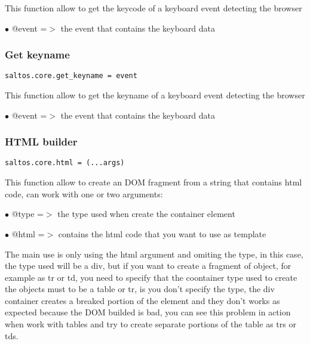 \documentclass[a4paper]{article}
\begin{document}
This function allow to get the keycode of a keyboard event detecting the browser

\begin{compactitem}
\item[\color{myblue}$\bullet$] @event =$>$ the event that contains the keyboard data
\end{compactitem}

\hypertarget{toc700}{}
\subsubsection{Get keyname}

\begin{lstlisting}
saltos.core.get_keyname = event
\end{lstlisting}

This function allow to get the keyname of a keyboard event detecting the browser

\begin{compactitem}
\item[\color{myblue}$\bullet$] @event =$>$ the event that contains the keyboard data
\end{compactitem}

\hypertarget{toc701}{}
\subsubsection{HTML builder}

\begin{lstlisting}
saltos.core.html = (...args)
\end{lstlisting}

This function allow to create an DOM fragment from a string that contains html code, can
work with one or two arguments:

\begin{compactitem}
\item[\color{myblue}$\bullet$] @type =$>$ the type used when create the container element
\item[\color{myblue}$\bullet$] @html =$>$ contains the html code that you want to use as template
\end{compactitem}

The main use is only using the html argument and omiting the type, in this case, the
type used will be a div, but if you want to create a fragment of object, for example
as tr or td, you need to specify that the coontainer type used to create the objects
must to be a table or tr, is you don't specify the type, the div container creates
a breaked portion of the element and they don't works as expected because the DOM
builded is bad, you can see this problem in action when work with tables and try to
create separate portions of the table as trs or tds.
\end{document}

